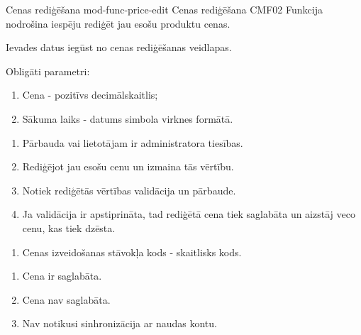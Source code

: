 \moduleFunctionTable
{Cenas rediģēšana}
{mod-func-price-edit}
{Cenas rediģēšana}
{CMF02}
{
	Funkcija nodrošina iespēju rediģēt jau esošu produktu cenas.
}
{
	Ievades datus iegūst no cenas rediģēšanas veidlapas.

	Obligāti parametri:
	\begin{enumerate}
		\item Cena - pozitīvs decimālskaitlis;
		\item Sākuma laiks - datums simbola virknes formātā.
	\end{enumerate}
}
{
	\begin{enumerate}
		\item Pārbauda vai lietotājam ir administratora tiesības.
		\item Rediģējot jau esošu cenu un izmaina tās vērtību.
		\item Notiek rediģētās vērtības validācija un pārbaude.
		\item Ja validācija ir apstiprināta, tad rediģētā cena tiek saglabāta un aizstāj veco cenu, kas tiek dzēsta.
	\end{enumerate}
}
{
	\begin{enumerate}
		\item Cenas izveidošanas stāvokļa kods - skaitlisks kods.
	\end{enumerate}
}
{
	\begin{enumerate}
		\item Cena ir saglabāta.
		\item Cena nav saglabāta.
		\item Nav notikusi sinhronizācija ar naudas kontu.
	\end{enumerate}
}
